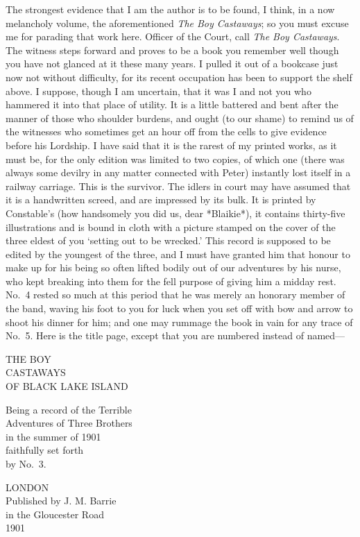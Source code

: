 The strongest evidence that I am the author is to be found, I think,
in a now melancholy volume, the aforementioned \emph{The Boy Castaways};
so you must excuse me for parading that work here.
Officer of the Court, call \emph{The Boy Castaways}.
The witness steps forward and proves to be a book you remember well
though you have not glanced at it these many years.
I pulled it out of a bookcase just now not without difficulty,
for its recent occupation has been to support the shelf above.
I suppose, though I am uncertain,
that it was I and not you who hammered it into that place of utility.
It is a little battered and bent after the manner of those who shoulder burdens,
and ought (to our shame) to remind us of the witnesses
who sometimes get an hour off from the cells to give evidence before his Lordship.
I have said that it is the rarest of my printed works, as it must be,
for the only edition was limited to two copies, of which one
(there was always some devilry in any matter connected with Peter)
instantly lost itself in a railway carriage.
This is the survivor.
The idlers in court may have assumed that it is a handwritten screed, and are impressed by its bulk.
It is printed by Constable’s
(how handsomely you did us, dear *Blaikie*),
it contains thirty-five illustrations
and is bound in cloth with a picture stamped on the cover
of the three eldest of you ‘setting out to be wrecked.’
This record is supposed to be edited by the youngest of the three,
and I must have granted him that honour
to make up for his being so often lifted bodily out of our adventures by his nurse,
who kept breaking into them for the fell purpose of giving him a midday rest.
No.~4 rested so much at this period that he was merely an honorary member of the band,
waving his foot to you for luck when you set off with bow and arrow to shoot his dinner for him;
and one may rummage the book in vain for any trace of No.~5.
Here is the title page, except that you are numbered instead of named—

\begin{center}
\begin{samepage}
	\uppercase{The Boy\\Castaways\\of Black Lake Island}

	Being a record of the Terrible\\
	Adventures of Three Brothers\\
	in the summer of 1901\\
	faithfully set forth\\by No.~3.

	LONDON\\[\baselineskip]

	Published by J. M. Barrie\\
	in the Gloucester Road\\
	1901
\end{samepage}
\end{center}

